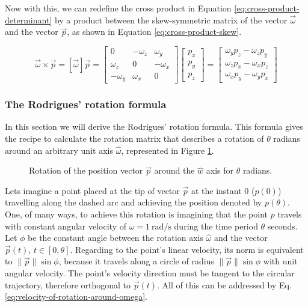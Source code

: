 \documentclass[12pt]{article}
\begin{document}
Now with this, we can redefine the cross product in Equation \ref{eq:cross-product-determinant} by a product between the skew-symmetric matrix of the vector $\vec{\omega}$ and the vector $\vec{p}$, as shown in Equation \ref{eq:cross-product-skew}.

\begin{equation}
    \vec{\omega} \times \vec{p} = \left[\vec{\omega}\right] \vec{p} = 
        \begin{bmatrix}
            0 & -\omega_z & \omega_y \\
            \omega_z & 0 & -\omega_x \\
            -\omega_y & \omega_x & 0
        \end{bmatrix}
        \begin{bmatrix}
            p_x \\ p_y \\ p_z
        \end{bmatrix} =
        \begin{bmatrix}
            \omega_y p_z - \omega_z p_y \\
            \omega_z p_x - \omega_x p_z \\
            \omega_x p_y - \omega_y p_x
        \end{bmatrix}
    \label{eq:cross-product-skew}
\end{equation}

\subsubsection{The Rodrigues' rotation formula}
In this section we will derive the Rodrigues' rotation formula. This formula gives the recipe to calculate the rotation matrix that describes a rotation of $\theta$ radians around an arbitrary unit axis $\hat{\omega}$, represented in Figure \ref{fig:rodrigues-rotation}.

\begin{figure}[h]
\centering
    
    \caption{Rotation of the position vector $\vec{p}$ around the $\hat{w}$ axis for $\theta$ radians.}
    \label{fig:rodrigues-rotation}
\end{figure}

Lets imagine a point placed at the tip of vector $\vec{p}$ at the instant $0$ ($p(0)$) travelling along the dashed arc and achieving the position denoted by $p(\theta)$. One, of many ways, to achieve this rotation is imagining that the point $p$ travels with constant angular velocity of $\omega = \SI[per-mode=symbol]{1}{\radian \per \second}$ during the time period $\theta$ seconds. Let $\phi$ be the constant angle between the rotation axis $\hat{\omega}$ and the vector $\vec{p}(t)\text{, } t \in [0, \theta]$. Regarding to the point's linear velocity, its norm is equivalent to $\lVert \vec{p} \rVert \sin{\phi}$, because it travels along a circle of radius $\lVert \vec{p} \rVert \sin{\phi}$ with unit angular velocity. The point's velocity direction must be tangent to the circular trajectory, therefore orthogonal to $\vec{p}(t)$. All of this can be addressed by Eq. \ref{eq:velocity-of-rotation-around-omega}.
\end{document}

